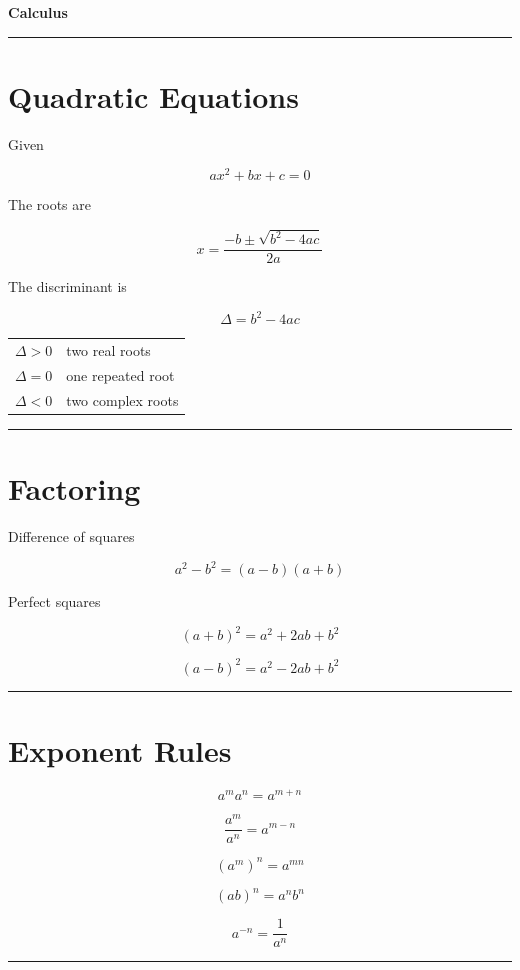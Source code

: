 \documentclass[10pt]{article}
\begin{document}
\centering
{\Large\bfseries Calculus}

\vspace{3mm}
\hrule
\vspace{3mm}

\section*{Quadratic Equations}

Given

\[
ax^2 + bx + c = 0
\]

The roots are

\[
x=
\frac{-b\pm\sqrt{b^2-4ac}}
{2a}
\]

The discriminant is

\[
\Delta=b^2-4ac
\]

\begin{tabular}{ll}
$\Delta>0$ & two real roots\\
$\Delta=0$ & one repeated root\\
$\Delta<0$ & two complex roots
\end{tabular}

\vspace{4mm}
\hrule
\vspace{2mm}

\section*{Factoring}

Difference of squares

\[
a^2-b^2=(a-b)(a+b)
\]

Perfect squares

\[
(a+b)^2=a^2+2ab+b^2
\]

\[
(a-b)^2=a^2-2ab+b^2
\]

\vspace{4mm}
\hrule
\vspace{2mm}

\section*{Exponent Rules}

\[
a^m a^n=a^{m+n}
\]

\[
\frac{a^m}{a^n}=a^{m-n}
\]

\[
(a^m)^n=a^{mn}
\]

\[
(ab)^n=a^n b^n
\]

\[
a^{-n}=\frac1{a^n}
\]

\vspace{4mm}
\hrule
\vspace{2mm}
\end{document}
